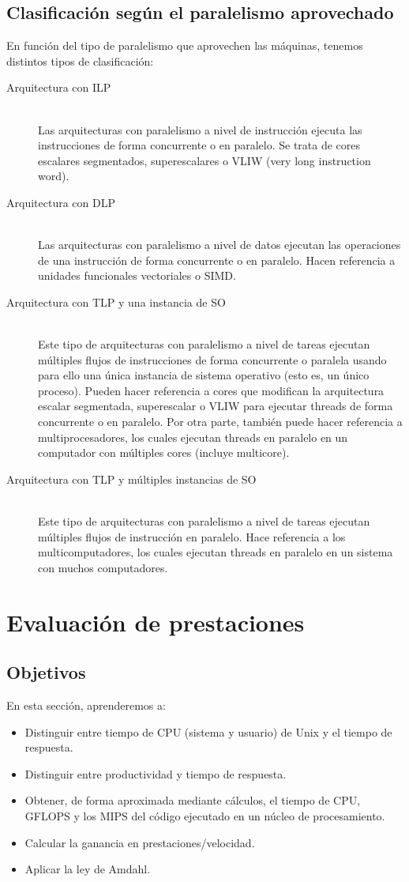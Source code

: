 \subsection{Clasificación según el paralelismo aprovechado}
En función del tipo de paralelismo que aprovechen las máquinas, tenemos distintos tipos de clasificación:
\begin{description}
    \item [Arquitectura con ILP]~\\
        Las arquitecturas con paralelismo a nivel de instrucción ejecuta las instrucciones de forma concurrente o en paralelo. Se trata de cores escalares segmentados, superescalares o VLIW (very long instruction word).
    \item [Arquitectura con DLP]~\\
        Las arquitecturas con paralelismo a nivel de datos ejecutan las operaciones de una instrucción de forma concurrente o en paralelo. Hacen referencia a unidades funcionales vectoriales o SIMD.
    \item [Arquitectura con TLP y una instancia de SO]~\\
        Este tipo de arquitecturas con paralelismo a nivel de tareas ejecutan múltiples flujos de instrucciones de forma concurrente o paralela usando para ello una única instancia de sistema operativo (esto es, un único proceso). Pueden hacer referencia a cores que modifican la arquitectura escalar segmentada, superescalar o VLIW para ejecutar threads de forma concurrente o en paralelo. Por otra parte, también puede hacer referencia a multiprocesadores, los cuales ejecutan threads en paralelo en un computador con múltiples cores (incluye multicore).
    \item [Arquitectura con TLP y múltiples instancias de SO]~\\
        Este tipo de arquitecturas con paralelismo a nivel de tareas ejecutan múltiples flujos de instrucción en paralelo. Hace referencia a los multicomputadores, los cuales ejecutan threads en paralelo en un sistema con muchos computadores.
\end{description}

\newpage
\section{Evaluación de prestaciones}
\subsection{Objetivos}
En esta sección, aprenderemos a:
\begin{itemize}
    \item Distinguir entre tiempo de CPU (sistema y usuario) de Unix y el tiempo de respuesta.
    \item Distinguir entre productividad y tiempo de respuesta.
    \item Obtener, de forma aproximada mediante cálculos, el tiempo de CPU, GFLOPS y los MIPS del código ejecutado en un núcleo de procesamiento.
    \item Calcular la ganancia en prestaciones/velocidad.
    \item Aplicar la ley de Amdahl.
\end{itemize}

